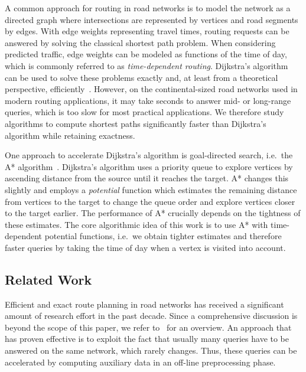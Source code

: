 \documentclass[a4paper,UKenglish,cleveref, autoref, thm-restate]{lipics-v2021}
\begin{document}
A common approach for routing in road networks is to model the network as a directed graph where intersections are represented by vertices and road segments by edges.
With edge weights representing travel times, routing requests can be answered by solving the classical shortest path problem.
When considering predicted traffic, edge weights can be modeled as functions of the time of day, which is commonly referred to as \emph{time-dependent routing}.
Dijkstra's algorithm can be used to solve these problems exactly and, at least from a theoretical perspective, efficiently~\cite{d-ntpcg-59}.
However, on the continental-sized road networks used in modern routing applications, it may take seconds to answer mid- or long-range queries, which is too slow for most practical applications.
We therefore study algorithms to compute shortest paths significantly faster than Dijkstra's algorithm while retaining exactness.

One approach to accelerate Dijkstra's algorithm is goal-directed search, i.e.\ the A* algorithm~\cite{hnr-afbhd-68}.
Dijkstra's algorithm uses a priority queue to explore vertices by ascending distance from the source until it reaches the target.
A* changes this slightly and employs a \emph{potential} function which estimates the remaining distance from vertices to the target to change the queue order and explore vertices closer to the target earlier.
The performance of A* crucially depends on the tightness of these estimates.
The core algorithmic idea of this work is to use A* with time-dependent potential functions, i.e.\ we obtain tighter estimates and therefore faster queries by taking the time of day when a vertex is visited into account.

\subsection{Related Work}

Efficient and exact route planning in road networks has received a significant amount of research effort in the past decade.
Since a comprehensive discussion is beyond the scope of this paper, we refer to~\cite{bdgmpsww-rptn-16} for an overview.
An approach that has proven effective is to exploit the fact that usually many queries have to be answered on the same network, which rarely changes.
Thus, these queries can be accelerated by computing auxiliary data in an off-line preprocessing phase.
\end{document}
